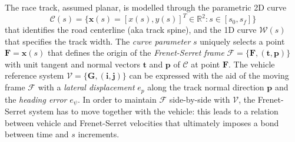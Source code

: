 \documentclass[conference]{IEEEtran} %
\renewcommand{\vec}[1]{\boldsymbol{#1}}
\DeclarePairedDelimiter{\norm}{\lVert}{\rVert}
\begin{document}
The race track, assumed planar, is modelled through the parametric 2D curve
\begin{equation}
\mathcal C(s) = \{ \vec x (s) = [x(s), y(s)]^T \in \mathbb{R}^2 : s \in [s_0, s_f] \}
\end{equation}
%
that identifies the road centerline (aka track spine), and the 1D curve $\mathcal W(s)$ that specifies the track width.
The \emph{curve parameter} $s$ uniquely selects a point $\vec F = \vec x(s)$ that defines the origin of the \emph{Frenet-Serret frame} $\mathcal F = \{ \vec F, (\vec t, \vec p) \}$ with unit tangent and normal vectors $\vec t$ and $\vec p$ of $\mathcal C$ at point $\vec F$.
%
The vehicle reference system $\mathcal V = \{ \vec G, (\vec i, \vec j) \}$ can be expressed with the aid of the moving frame $\mathcal F$ with a \emph{lateral displacement} $e_p$ along the track normal direction $\vec p$ and the \emph{heading error} $e_\psi$.
In order to maintain $\mathcal F$ side-by-side with $\mathcal V$, the Frenet-Serret system has to move together with the vehicle: this leads to a relation between vehicle and Frenet-Serret velocities that ultimately imposes a bond between time and $s$ increments.

%

\end{document}
